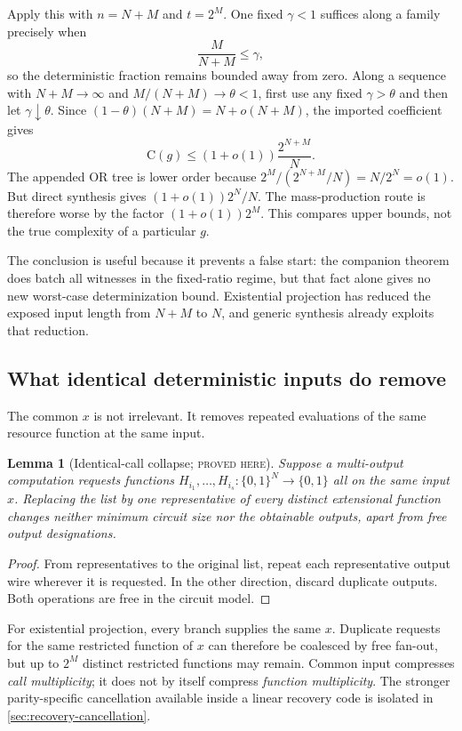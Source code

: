 \documentclass[11pt]{article}
\newtheorem{lemma}[lemma]{Lemma}
\theoremstyle{definition}
\theoremstyle{remark}
\newcommand{\bits}{\{0,1\}}
\newcommand{\C}{\mathrm C}
\newcommand{\status}[1]{\textsc{#1}}
\begin{document}
Apply this with $n=N+M$ and $t=2^M$.  One fixed $\gamma<1$ suffices along a
family precisely when
\[
  \frac{M}{N+M}\le\gamma,
  \tag{2.4}\label{eq:fixed-ratio}
\]
so the deterministic fraction remains bounded away from zero.  Along a
sequence with $N+M\to\infty$ and $M/(N+M)\to\theta<1$, first use any fixed
$\gamma>\theta$ and then let $\gamma\downarrow\theta$.  Since
$(1-\theta)(N+M)=N+o(N+M)$, the imported coefficient gives
\[
  \C(g)
  \le (1+o(1))\frac{2^{N+M}}{N}.
  \tag{2.5}\label{eq:mp-projection}
\]
The appended OR tree is lower order because
$2^M/(2^{N+M}/N)=N/2^N=o(1)$.  But direct synthesis gives
$(1+o(1))2^N/N$.  The mass-production route is therefore worse by the factor
$(1+o(1))2^M$.  This compares upper bounds, not the true complexity of a
particular $g$.

The conclusion is useful because it prevents a false start: the companion
theorem does batch all witnesses in the fixed-ratio regime, but that fact
alone gives no new worst-case determinization bound.  Existential projection
has reduced the exposed input length from $N+M$ to $N$, and generic synthesis
already exploits that reduction.

\subsection{What identical deterministic inputs do remove}

The common $x$ is not irrelevant.  It removes repeated evaluations of the
same resource function at the same input.

\begin{lemma}[Identical-call collapse; \status{proved here}]
\label{lem:identical-call}
Suppose a multi-output computation requests functions
$H_{i_1},\ldots,H_{i_s}:\bits^N\to\bits$ all on the same input $x$.  Replacing
the list by one representative of every distinct extensional function changes
neither minimum circuit size nor the obtainable outputs, apart from free
output designations.
\end{lemma}

\begin{proof}
From representatives to the original list, repeat each representative output
wire wherever it is requested.  In the other direction, discard duplicate
outputs.  Both operations are free in the circuit model.
\end{proof}

For existential projection, every branch supplies the same $x$.  Duplicate
requests for the same restricted function of $x$ can therefore be coalesced
by free fan-out, but up to $2^M$ distinct restricted functions may remain.
Common input compresses \emph{call multiplicity}; it does not by itself
compress \emph{function multiplicity}.  The stronger parity-specific
cancellation available inside a linear recovery code is isolated in
\cref{sec:recovery-cancellation}.
\end{document}
